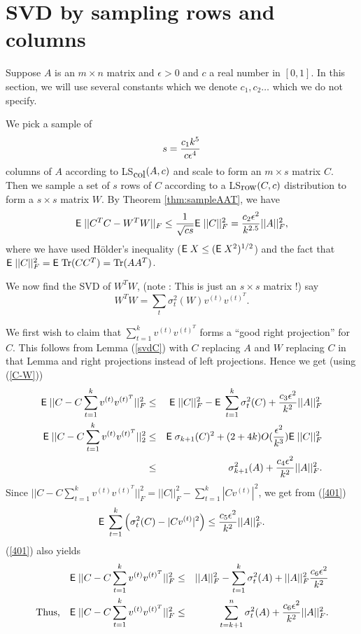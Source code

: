 \documentclass{book}
\numberwithin{exercise}{chapter}
\begin{document}
\section{SVD by sampling rows and columns}

Suppose $A$ is an $m\times n$ matrix and $\epsilon >0$
and $c$ a real number in $[0,1]$. In this section, we will use several constants
which we denote $c_1,c_2\ldots$ which we do not specify.

We pick a sample of
$$s={c_1k^5\over c\epsilon^4}$$
columns of $A$ according to LS$_{\hbox{col}}(A,c)$ and scale to form an $m\times s$ matrix $C$. Then we sample a set of
$s$
rows of $C$ according to a LS$_{\hbox{row}}(C,c)$ distribution to form a $s\times s$ matrix $W$. By Theorem \ref{thm:sampleAAT}, we have
\begin{equation}\label{C-W}
\hbox{{\sf E}\;}||C^TC-W^TW||_F\leq {1\over \sqrt{cs}}\hbox{{\sf E}\;}||C||_F^2= {c_2\epsilon^2\over k^{2.5}}||A||_F^2,
\end{equation}
where we have used H\"{o}lder's inequality ($\hbox{{\sf E}\;} X\leq (\hbox{{\sf E}\;} X^2)^{1/2}$) and the fact that
$\hbox{{\sf E}\;}||C||_F^2=\hbox{{\sf E}\;}\hbox{Tr} (CC^T)=\hbox{Tr} (AA^T)$.

We now find the SVD of $W^TW$, (note : This is just an $s\times s$ matrix !) say
$$W^TW=\sum_t \sigma_t^2(W)v^{(t)}v^{(t)^T}.$$

We first wish to claim that $\sum_{t=1}^kv^{(t)}v^{(t)^T}$ forms a ``good right projection'' for $C$. This
follows from Lemma (\ref{svdC}) with
$C$ replacing $A$ and $W$ replacing $C$ in that Lemma and right projections instead of left projections. Hence
we get (using (\ref{C-W}))
\begin{eqnarray}
\hbox{{\sf E}\;}||C-C\sum_{t=1}^kv^{(t)}v^{(t)^T}||_F^2&\leq& \hbox{{\sf E}\;}||C||_F^2-\hbox{{\sf E}\;}\sum_{t=1}^k\sigma_t^2(C)
         +{c_3\epsilon^2\over k^2}||A||_F^2\\
\hbox{{\sf E}\;}||C-C\sum_{t=1}^kv^{(t)}v^{(t)^T}||_2^2&\leq&
\hbox{{\sf E}\;}\sigma_{k+1}(C)^2+(2+4k)O(\frac{\epsilon^2}{k^3})\hbox{{\sf E}\;}||C||_F^2\\
&\leq& \sigma_{k+1}^2(A)+{c_4\epsilon^2\over k^2}||A||_F^2\label{401}.
 \end{eqnarray}
Since $||C-C\sum_{t=1}^kv^{(t)}v^{(t)^T}||_F^2=||C||_F^2-\sum_{t=1}^k|Cv^{(t)}|^2$, we get
from (\ref{401})
\begin{equation}\label{constsvd1}
\hbox{{\sf E}\;}\sum_{t=1}^k\left( \sigma_t^2(C)-|Cv^{(t)}|^2\right) \leq
{c_5\epsilon^2\over k^2} ||A||_F^2.
\end{equation}
(\ref{401}) also yields
\begin{eqnarray}
\hbox{{\sf E}\;}||C-C\sum_{t=1}^kv^{(t)}v^{(t)^T}||_F^2&\leq& ||A||_F^2-\sum_{t=1}^k\sigma_t^2(A)+||A||_F^2
{c_6\epsilon^2\over k^2}\nonumber\\
\hbox{Thus,}\quad
\hbox{{\sf E}\;}||C-C\sum_{t=1}^kv^{(t)}v^{(t)^T}||_F^2&\leq& \sum_{t=k+1}^n\sigma_t^2(A)+{c_6\epsilon^2\over k^2}||A||_F^2
\label{500}.
\end{eqnarray}
\end{document}
